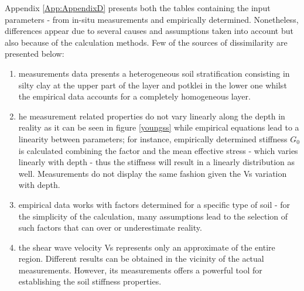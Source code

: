\documentclass[10pt,a4paper]{report}
\begin{document}
Appendix \ref{App:AppendixD} presents both the tables containing the input parameters - from in-situ measurements and empirically determined. Nonetheless, differences appear due to several causes and assumptions taken into account but also because of the calculation methods. Few of the sources of dissimilarity are presented below:
\begin{enumerate}
	\item measurements data presents a heterogeneous soil stratification consisting in silty clay at the upper part of the layer and potklei in the lower one whilst the empirical data accounts for a completely homogeneous layer.
	\item he measurement related properties do not vary linearly along the depth in reality as it can be seen in figure \ref{youngss} while empirical equations lead to a linearity between parameters; for instance, empirically determined stiffness $G_0$ is calculated combining the factor and the mean effective stress - which varies linearly with depth - thus the stiffness will result in a linearly distribution as well. Measurements do not display the same fashion given the Vs variation with depth.
	\item empirical data works with factors determined for a specific type of soil - for the simplicity of the calculation, many assumptions lead to the selection of such factors that can over or underestimate reality.
	\item the shear wave velocity Vs represents only an approximate of the entire region. Different results can be obtained in the vicinity of the actual measurements. However, its measurements offers a powerful tool for establishing the soil stiffness properties. 
\end{enumerate}
\end{document}
